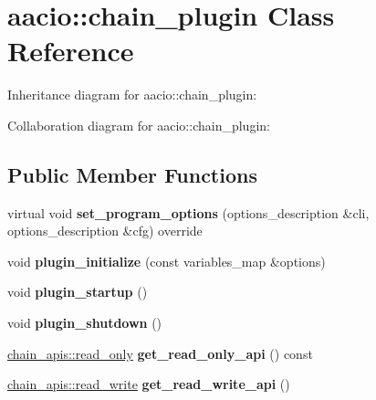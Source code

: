 \hypertarget{classaacio_1_1chain__plugin}{}\section{aacio\+:\+:chain\+\_\+plugin Class Reference}
\label{classaacio_1_1chain__plugin}


Inheritance diagram for aacio\+:\+:chain\+\_\+plugin\+:


Collaboration diagram for aacio\+:\+:chain\+\_\+plugin\+:
\subsection*{Public Member Functions}
\begin{DoxyCompactItemize}
\item 
\mbox{\label{classaacio_1_1chain__plugin_aabb3367fd38e616cedca00bac72ecb28}} 
virtual void {\bfseries set\+\_\+program\+\_\+options} (options\+\_\+description \&cli, options\+\_\+description \&cfg) override
\item 
\mbox{\label{classaacio_1_1chain__plugin_a0192ac61f3f59d4fdf2dcbbd2c7104ca}} 
void {\bfseries plugin\+\_\+initialize} (const variables\+\_\+map \&options)
\item 
\mbox{\label{classaacio_1_1chain__plugin_affe5ea83d9db4d721af39fd7568c5875}} 
void {\bfseries plugin\+\_\+startup} ()
\item 
\mbox{\label{classaacio_1_1chain__plugin_a3ed4600a8200efd4cbad0e547a3ffbde}} 
void {\bfseries plugin\+\_\+shutdown} ()
\item 
\mbox{\label{classaacio_1_1chain__plugin_a832c24adaccabdced041b8b28333bb6b}} 
\mbox{\hyperlink{classaacio_1_1chain__apis_1_1read__only}{chain\+\_\+apis\+::read\+\_\+only}} {\bfseries get\+\_\+read\+\_\+only\+\_\+api} () const
\item 
\mbox{\label{classaacio_1_1chain__plugin_a2b4d6a23ecab8f50e42f6c2221124245}} 
\mbox{\hyperlink{classaacio_1_1chain__apis_1_1read__write}{chain\+\_\+apis\+::read\+\_\+write}} {\bfseries get\+\_\+read\+\_\+write\+\_\+api} ()

\end{DoxyCompactItemize}
